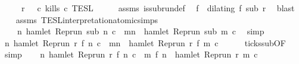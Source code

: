 \begin{isabellebody}
\ \ \ \ \ {\isacartoucheopen}r\ {\isasymin}\ {\isasymlbrakk}\ c\ kills\ c\ {\isasymrbrakk}\isactrlsub T\isactrlsub E\isactrlsub S\isactrlsub L{\isacartoucheclose}\isanewline
%
\isadelimproof
%
\endisadelimproof
%
\isatagproof
{}\isamarkupfalse%
\ {\isacharminus}\isanewline
\ \ \isamarkupfalse%
\ assms{\isacharparenleft}{}{\isacharparenright}\ is{\isacharunderscore}subrun{\isacharunderscore}def\ \isamarkupfalse%
\ f\ \ {\isacharasterisk}{\isacharcolon}{\isacartoucheopen}dilating\ f\ sub\ r{\isacartoucheclose}\ \isamarkupfalse%
\ blast\isanewline
\ \ \isamarkupfalse%
\ assms{\isacharparenleft}{}{\isacharparenright}\ TESL{\isacharunderscore}interpretation{\isacharunderscore}atomic{\isachardot}simps{\isacharparenleft}{}{\isacharparenright}\ \isamarkupfalse%
\isanewline
\ \ \ \ {\isacartoucheopen}{\isasymforall}n{\isachardot}\ hamlet\ {\isacharparenleft}Rep{\isacharunderscore}run\ sub\ n\ c\ {\isasymlongrightarrow}\ {\isacharparenleft}{\isasymforall}m{\isasymge}n{\isachardot}\ {\isasymnot}\ hamlet\ {\isacharparenleft}Rep{\isacharunderscore}run\ sub\ m\ c\ \isamarkupfalse%
\ simp\isanewline
\ \ \isamarkupfalse%
\ {\isacartoucheopen}{\isasymforall}n{\isachardot}\ hamlet\ {\isacharparenleft}Rep{\isacharunderscore}run\ r\ {\isacharparenleft}f\ n{\isacharparenright}\ c\ {\isasymlongrightarrow}\ {\isacharparenleft}{\isasymforall}m{\isasymge}n{\isachardot}\ {\isasymnot}\ hamlet\ {\isacharparenleft}Rep{\isacharunderscore}run\ r\ {\isacharparenleft}f\ m{\isacharparenright}\ c\isanewline
\ \ \ \ \isamarkupfalse%
\ ticks{\isacharunderscore}sub{\isacharbrackleft}OF\ {\isacharasterisk}{\isacharbrackright}\ \isamarkupfalse%
\ simp\isanewline
\ \ \isamarkupfalse%
\ {\isacartoucheopen}{\isasymforall}n{\isachardot}\ hamlet\ {\isacharparenleft}Rep{\isacharunderscore}run\ r\ {\isacharparenleft}f\ n{\isacharparenright}\ c\ {\isasymlongrightarrow}\ {\isacharparenleft}{\isasymforall}m{\isasymge}\ {\isacharparenleft}f\ n{\isacharparenright}{\isachardot}\ {\isasymnot}\ hamlet\ {\isacharparenleft}Rep{\isacharunderscore}run\ r\ m\ c\isanewline

\end{isabellebody}
